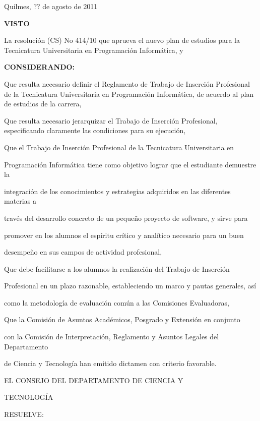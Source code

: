 \documentclass[a4paper,12pt]{article}
\title{}
\author{}
\date{}
\begin{document}
\maketitle

Quilmes, ?? de agosto de 2011

\textbf{VISTO}

La resolución (CS) No 414/10 que aprueva el nuevo plan de estudios para la Tecnicatura Universitaria 
en Programación Informática, y
\newline

\textbf{CONSIDERANDO:}

Que resulta necesario definir el Reglamento de Trabajo de Inserción
Profesional de la Tecnicatura Universitaria en Programación Informática, de acuerdo al
plan de estudios de la carrera,

Que resulta necesario jerarquizar el Trabajo de Inserción Profesional,
especificando claramente las condiciones para su ejecución,

Que el Trabajo de Inserción Profesional de la Tecnicatura Universitaria en

Programación Informática tiene como objetivo lograr que el estudiante demuestre la

integración de los conocimientos y estrategias adquiridos en las diferentes materias a

través del desarrollo concreto de un pequeño proyecto de software, y sirve para

promover en los alumnos el espíritu crítico y analítico necesario para un buen

desempeño en sus campos de actividad profesional,

Que debe facilitarse a los alumnos la realización del Trabajo de Inserción

Profesional en un plazo razonable, estableciendo un marco y pautas generales, así

como la metodología de evaluación común a las Comisiones Evaluadoras,

Que la Comisión de Asuntos Académicos, Posgrado y Extensión en conjunto

con la Comisión de Interpretación, Reglamento y Asuntos Legales del Departamento

de Ciencia y Tecnología han emitido dictamen con criterio favorable.

EL CONSEJO DEL DEPARTAMENTO DE CIENCIA Y

TECNOLOGÍA

RESUELVE:
\end{document}
